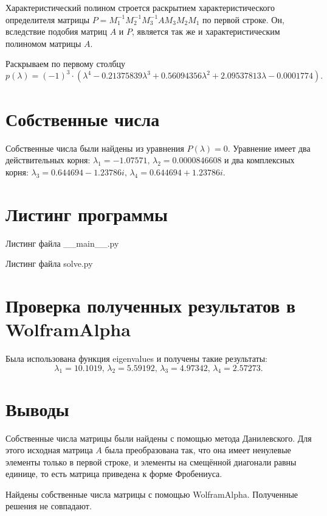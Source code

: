Характеристический полином строется раскрытием характеристического определителя матрицы
$P = M_1^{-1} M_2^{-1} M_3^{-1} AM_3 M_2 M_1$ по первой строке.
Он, вследствие подобия матриц $A$ и $P$, является так же и характеристическим полиномом матрицы $A$.

Раскрываем по первому столбцу
$$p \left( \lambda \right) =
  \left( -1 \right)^3 \cdot
  \left(
    \lambda^4 - 0.21375839 \lambda^3 + 0.56094356 \lambda^2 + 2.09537813 \lambda - 0.0001774
  \right).$$

\chapter{Собственные числа}

Собственные числа были найдены из уравнения $P \left( \lambda \right) = 0$.
Уравнение имеет два действительных корня:
$ \lambda_1 = -1.07571, \, \lambda_2 = 0.0000846608$ и два комплексных корня:
$ \lambda_3 = 0.644694 - 1.23786i, \, \lambda_4 = 0.644694 + 1.23786i$.

\chapter{Листинг программы}

Листинг файла \_\_main\_\_.py
\lstset{inputencoding=utf8, extendedchars=\true}


Листинг файла solve.py
\lstset{inputencoding=utf8, extendedchars=\true}


\chapter{Проверка полученных результатов в WolframAlpha}

Была использована функция eigenvalues и получены такие результаты:
$$ \lambda_1 = 10.1019, \,
  \lambda_2 = 5.59192, \,
  \lambda_3 = 4.97342, \,
  \lambda_4 = 2.57273.$$

\chapter*{Выводы}

Собственные числа матрицы были найдены с помощью метода Данилевского.
Для этого исходная матрица $A$ была преобразована так,
что она имеет ненулевые элементы только в первой строке,
и элементы на смещённой диагонали равны единице, то есть матрица приведена к форме Фробениуса.

Найдены собственные числа матрицы с помощью WolframAlpha.
Полученные решения не совпадают.


